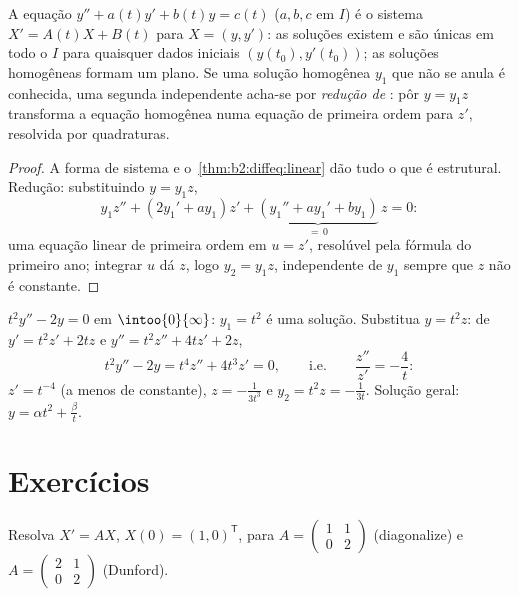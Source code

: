 \begin{proposition}\label{prop:b2:diffeq:secondorder}
A equação $y'' + a(t)y' + b(t)y = c(t)$ ($a, b, c$  em
$I$) é o sistema $X' = A(t)X + B(t)$ para $X = (y, y')$: as soluções
existem e são únicas em todo o $I$ para quaisquer dados iniciais $(y(t_0),
y'(t_0))$; as soluções homogêneas formam um plano. Se uma solução
homogênea $y_1$ que não se anula é conhecida, uma segunda independente
acha-se por \emph{redução de }: pôr $y = y_1 z$ transforma a
equação homogênea numa equação de primeira ordem para $z'$, resolvida
por quadraturas.
\end{proposition}

\begin{proof}
A forma de sistema e o~\cref{thm:b2:diffeq:linear} dão tudo o que é
estrutural. Redução: substituindo $y = y_1z$,
\[
y_1 z'' + (2y_1' + a y_1)z' + \underbrace{(y_1'' + ay_1' +
by_1)}_{=\,0}\,z = 0 :
\]
uma equação linear de primeira ordem em $u = z'$, resolúvel pela fórmula do
primeiro ano; integrar $u$ dá $z$, logo $y_2 = y_1 z$,
independente de $y_1$ sempre que $z$ não é constante.
\end{proof}

\begin{example}\label{ex:b2:diffeq:lowering}
$t^2y'' - 2y = 0$ em $\intoo{0}{\infty}$: $y_1 = t^2$ é uma
solução. Substitua $y = t^2z$: de $y' = t^2z' + 2tz$ e $y''
= t^2z'' + 4tz' + 2z$,
\[
t^2y'' - 2y = t^4 z'' + 4t^3z' = 0,
\qquad\text{i.e.}\qquad \frac{z''}{z'} = -\frac4t :
\]
$z' = t^{-4}$ (a menos de constante), $z = -\frac{1}{3t^3}$ e $y_2
= t^2z = -\frac{1}{3t}$. Solução geral: $y = \alpha t^2 +
\frac{\beta}{t}$.
\end{example}

\section{Exercícios}

\begin{exercise}[$\star$]\label{exo:b2:diffeq:1}
Resolva $X' = AX$, $X(0) = (1, 0)^{\mathsf T}$, para $A =
\begin{pmatrix} 1 & 1\\ 0 & 2\end{pmatrix}$ (diagonalize) e $A =
\begin{pmatrix} 2 & 1\\ 0 & 2 \end{pmatrix}$ (Dunford).
\end{exercise}

